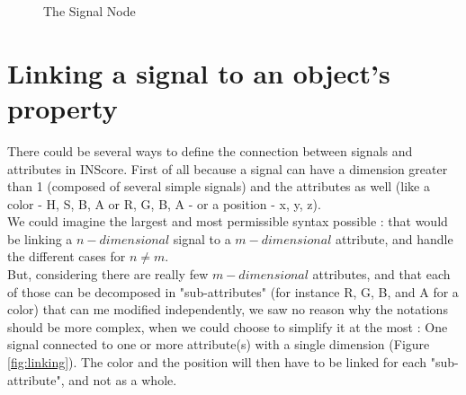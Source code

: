 \documentclass[a4paper]{article}
\begin{document}
\begin{figure}[h]

 \caption{The Signal Node}
 \label{fig:signalNode}
\end{figure}

\section{Linking a signal to an object's property}\label{sec:link}

There could be several ways to define the connection between signals and attributes in INScore. First of all because a signal can have a dimension greater than 1 (composed of several simple signals) and the attributes as well (like a color - H, S, B, A or R, G, B, A - or  a position - x, y, z). 
\\

We could imagine the largest and most permissible syntax possible : that would be linking a $n-dimensional$ signal to a $m-dimensional$ attribute, and handle the different cases for $n \neq{} m$. 
\\

But, considering there are really few $m-dimensional$ attributes, and that each of those can be decomposed in "sub-attributes" (for instance R, G, B, and A for a color) that can me modified independently, we saw no reason why the notations should be more complex, when we could choose to simplify it at the most : One signal connected to one or more attribute(s) with a single dimension (Figure \ref{fig:linking}). The color and the position will then have to be linked for each "sub-attribute", and not as a whole.
\\
\end{document}
